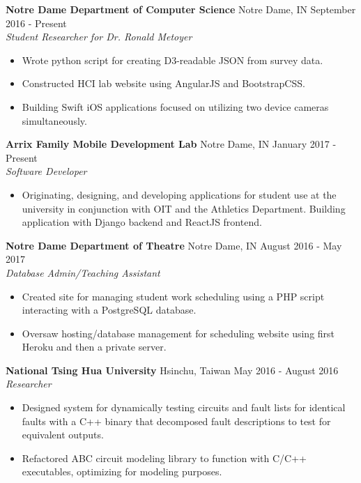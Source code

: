 \documentclass[9pt]{article}
\begin{document}
    \textbf{Notre Dame Department of Computer Science}
    \tab
    Notre Dame, IN
    \hfill
    September 2016 - Present
    \\
    \textit{Student Researcher for Dr. Ronald Metoyer}
    \begin{itemize}
      \item Wrote python script for creating D3-readable JSON from survey data.
      \item Constructed HCI lab website using AngularJS and BootstrapCSS.
      \item Building Swift iOS applications focused on utilizing two device cameras simultaneously.
    \end{itemize}
    
    \textbf{Arrix Family Mobile Development Lab}
    \tab
    Notre Dame, IN
    \hfill
    January 2017 - Present
    \\
    \textit{Software Developer}
    \begin{itemize}
      \item Originating, designing, and developing applications for student use at the university in conjunction with OIT and the Athletics Department. Building application with Django backend and ReactJS frontend.
    \end{itemize}
    
    \textbf{Notre Dame Department of Theatre}
    \tab
    Notre Dame, IN  
    \hfill
    August 2016 - May 2017
    \\
    \textit{Database Admin/Teaching Assistant}
    \begin{itemize}
      \item Created site for managing student work scheduling using a PHP script interacting with a PostgreSQL database.
      \item Oversaw hosting/database management for scheduling website using first Heroku and then a private server.
    \end{itemize}
    
    \textbf{National Tsing Hua University}
    \tab
    Hsinchu, Taiwan
    \hfill
    May 2016 - August 2016
    \\
    \textit{Researcher}
    \begin{itemize}
      \item Designed system for dynamically testing circuits and fault lists for identical faults with a C++ binary that decomposed fault descriptions to test for equivalent outputs.
      \item Refactored ABC circuit modeling library to function with C/C++ executables, optimizing for modeling purposes.
    \end{itemize}
    
\end{document}
